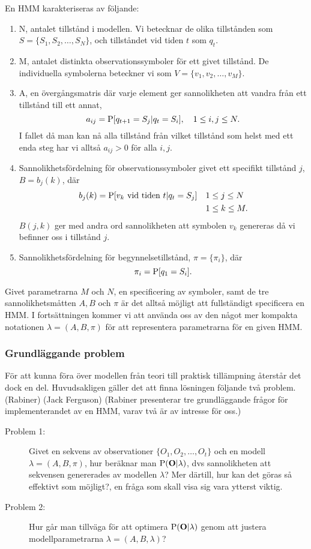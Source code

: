 \documentclass[../rapport_MVEX01-11-05]{subfiles}
\begin{document}
En HMM karakteriseras av följande:
\begin{enumerate}
\item N, antalet tillstånd i modellen. Vi betecknar de olika
  tillstånden som $S = \{S_1, S_2, \dots, S_N\}$, och tillståndet vid
  tiden $t$ som $q_t$.
\item M, antalet distinkta observationssymboler för ett givet
  tillstånd. De individuella symbolerna beteckner vi som $V =
  \{v_1,v_2,\dots,v_M\}$.
\item A, en övergångsmatris där varje element ger sannolikheten att
  vandra från ett tillstånd till ett annat, 
\begin{equation*}
a_{ij} = \mathrm{P}[q_{t+1} = S_j | q_t = S_i],\quad 1 \leq i,j \leq N.
\end{equation*}
I fallet då man kan nå alla tillstånd från vilket tillstånd som helst
med ett enda steg har vi alltså $a_{ij} > 0$ för alla $i,j$. 
\item Sannolikhetsfördelning för observationssymboler givet ett
  specifikt tillstånd $j$, $B = b_j(k)$, där 
\begin{align*}
b_j(k) = \mathrm{P}[v_k \text{ vid tiden } t|q_t = S_j] \quad &1 \leq j \leq N\\
&1 \leq k \leq M.
\end{align*}
$B(j,k)$ ger med andra ord sannolikheten att symbolen $v_k$ genereras
då vi befinner oss i tillstånd $j$.
\item Sannolikhetsfördelning för begynnelsetillstånd, $\pi =
  \{\pi_i\}$, där
\begin{equation*}
\pi_i = \mathrm{P}[q_1 = S_i].
\end{equation*}
\end{enumerate}
Givet parametrarna $M$ och $N$, en specificering av symboler, samt de
tre sannolikhetsmåtten $A, B$ och $\pi$ är det alltså möjligt att
fullständigt specificera en HMM. I fortsättningen kommer vi att
använda oss av den något mer kompakta notationen $\lambda = (A,B,\pi)$
för att representera parametrarna för en given HMM.

\subsubsection{Grundläggande problem}

För att kunna föra över modellen från teori till praktisk tillämpning
återstår det dock en del. Huvudsakligen gäller det att finna lösningen
följande två problem. (Rabiner) (Jack Ferguson) (Rabiner presenterar
tre grundläggande frågor för implementerandet av en HMM, varav två är
av intresse för oss.)
\begin{description}
\item[Problem 1:] Givet en sekvens av observationer
  $\{O_1,O_2,\dots,O_t\}$ och en modell $\lambda = (A,B,\pi)$, hur
  beräknar man $\mathrm{P}(\textbf{O}|\lambda)$, dvs sannolikheten att
  sekvensen genererades av modellen $\lambda$? Mer därtill, hur kan
  det göras så effektivt som möjligt?, en fråga som skall visa sig
  vara ytterst viktig.  
\item[Problem 2:] Hur går man tillväga för att optimera
  $\mathrm{P}(\textbf{O}|\lambda)$ genom att justera
  modellparametrarna $\lambda = (A,B,\lambda)$? 
\end{description}
\end{document}
